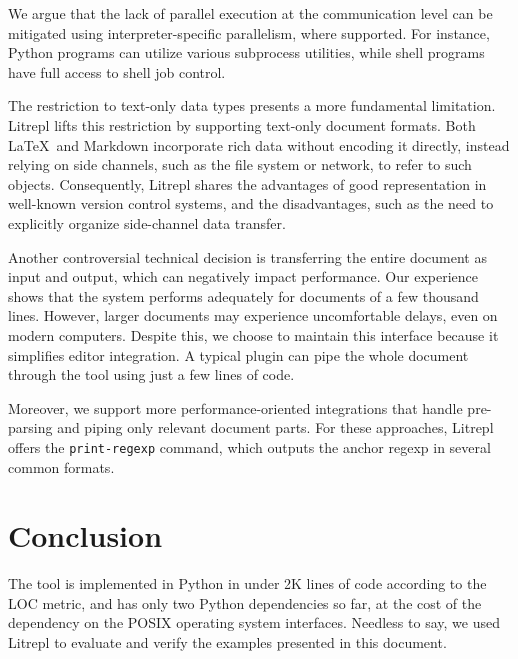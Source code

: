 \documentclass[letterpaper,12pt,twocolumn]{article}
\newcommand{\Latex}{\LaTeX\ }
\begin{document}
We argue that the lack of parallel execution at the communication level can be
mitigated using interpreter-specific parallelism, where supported. For instance,
Python programs can utilize various subprocess utilities, while shell programs
have full access to shell job control.

The restriction to text-only data types presents a more fundamental limitation.
Litrepl lifts this restriction by supporting text-only document formats. Both
\Latex and Markdown incorporate rich data without encoding it directly, instead
relying on side channels, such as the file system or network, to refer to such
objects. Consequently, Litrepl shares the advantages of good representation in
well-known version control systems, and the disadvantages, such as the need to
explicitly organize side-channel data transfer.

Another controversial technical decision is transferring the entire document as
input and output, which can negatively impact performance. Our experience shows
that the system performs adequately for documents of a few thousand lines.
However, larger documents may experience uncomfortable delays, even on modern
computers. Despite this, we choose to maintain this interface because it
simplifies editor integration. A typical plugin can pipe the whole document
through the tool using just a few lines of code.

Moreover, we support more performance-oriented integrations that handle
pre-parsing and piping only relevant document parts. For these approaches,
Litrepl offers the \verb|print-regexp| command, which outputs the anchor regexp
in several common formats.

\section{Conclusion}

The tool is implemented in Python in under 2K lines of code according to the LOC
metric, and has only two Python dependencies so far, at the cost of the
dependency on the POSIX operating system interfaces. Needless to say, we used
Litrepl to evaluate and verify the examples presented in this document.

\printbibliography
\end{document}
